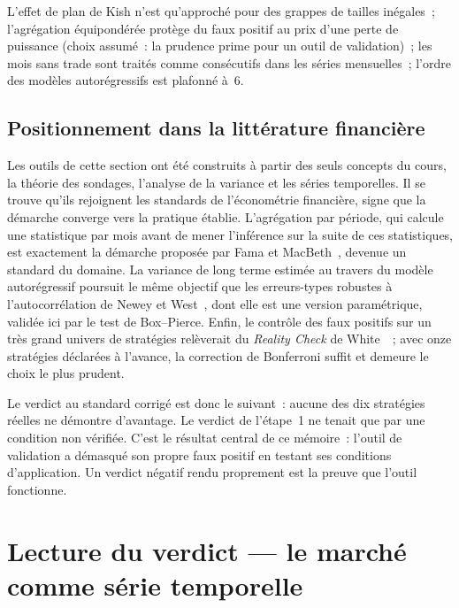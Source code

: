\begin{limites}
L'effet de plan de Kish n'est qu'approché pour des grappes de tailles
inégales~; l'agrégation équipondérée protège du faux positif au prix
d'une perte de puissance (choix assumé~: la prudence prime pour un outil
de validation)~; les mois sans trade sont traités comme consécutifs dans
les séries mensuelles~; l'ordre des modèles autorégressifs est plafonné
à~6.
\end{limites}

\subsection{Positionnement dans la littérature financière}
\label{sec:b1-positionnement}

Les outils de cette section ont été construits à partir des seuls
concepts du cours, la théorie des sondages, l'analyse de la variance et
les séries temporelles. Il se trouve qu'ils rejoignent les standards de
l'économétrie financière, signe que la démarche converge vers la
pratique établie. L'agrégation par période, qui calcule une statistique
par mois avant de mener l'inférence sur la suite de ces statistiques,
est exactement la démarche proposée par Fama et
MacBeth~\cite{famamacbeth1973}, devenue un standard du domaine. La
variance de long terme estimée au travers du modèle autorégressif
poursuit le même objectif que les erreurs-types robustes à
l'autocorrélation de Newey et West~\cite{neweywest1987}, dont elle est
une version paramétrique, validée ici par le test de Box--Pierce. Enfin,
le contrôle des faux positifs sur un très grand univers de stratégies
relèverait du \emph{Reality Check} de White~\cite{white2000}~; avec onze
stratégies déclarées à l'avance, la correction de Bonferroni suffit et
demeure le choix le plus prudent.

Le verdict au standard corrigé est donc le suivant~: aucune des dix
stratégies réelles ne démontre d'avantage. Le verdict de l'étape~1 ne
tenait que par une condition non vérifiée. C'est le résultat central de
ce mémoire~: l'outil de validation a démasqué son propre faux positif en
testant ses conditions d'application. Un verdict négatif rendu
proprement est la preuve que l'outil fonctionne.

\section{Lecture du verdict --- le marché comme série temporelle}
\label{sec:b1-lecture}


